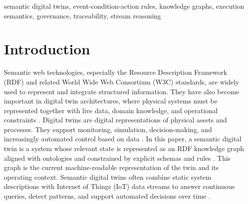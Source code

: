 \documentclass{ieeeaccess}
\theoremstyle{definition}
\theoremstyle{plain}
\theoremstyle{remark}
\begin{document}
\begin{keywords}
semantic digital twins, event-condition-action rules, knowledge graphs, execution semantics, governance, traceability, stream reasoning
\end{keywords}

\titlepgskip=-21pt

\maketitle
\section{Introduction}
\label{sec:introduction}
Semantic web technologies, especially the Resource Description Framework (RDF) and related World Wide Web Consortium (W3C) standards, are widely used to represent and integrate structured information. They have also become important in digital twin architectures, where physical systems must be represented together with live data, domain knowledge, and operational constraints \cite{Karabulut2024OntologiesDigitalTwins,Ramonell2023KGraphDT}. Digital twins are digital representations of physical assets and processes. They support monitoring, simulation, decision-making, and increasingly automated control based on data \cite{Karabulut2024OntologiesDigitalTwins,Ramonell2023KGraphDT}. In this paper, a semantic digital twin is a system whose relevant state is represented as an RDF knowledge graph aligned with ontologies and constrained by explicit schemas and rules \cite{Bader2019AAS,Donkers2024OccupantDigitalTwin}. This graph is the current machine-readable representation of the twin and its operating context. Semantic digital twins often combine static system descriptions with Internet of Things (IoT) data streams to answer continuous queries, detect patterns, and support automated decisions over time \cite{DellAglio2017StreamReasoningSurvey}.
\end{document}
